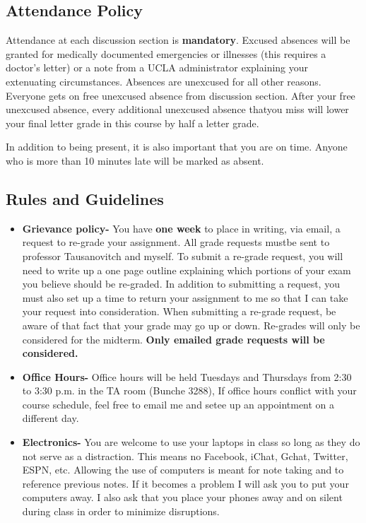 \documentclass[11pt,]{article}
\begin{document}
\subsection{Attendance Policy}\label{attendance-policy}

Attendance at each discussion section is \textbf{mandatory}. Excused
absences will be granted for medically documented emergencies or
illnesses (this requires a doctor's letter) or a note from a UCLA
administrator explaining your extenuating circumstances. Absences are
unexcused for all other reasons. Everyone gets on free unexcused absence
from discussion section. After your free unexcused absence, every
additional unexcused absence thatyou miss will lower your final letter
grade in this course by half a letter grade.

In addition to being present, it is also important that you are on time.
Anyone who is more than 10 minutes late will be marked as absent.

\subsection{Rules and Guidelines}\label{rules-and-guidelines}

\begin{itemize}
\item
  \textbf{Grievance policy-} You have \textbf{one week} to place in
  writing, via email, a request to re-grade your assignment. All grade
  requests mustbe sent to professor Tausanovitch and myself. To submit a
  re-grade request, you will need to write up a one page outline
  explaining which portions of your exam you believe should be
  re-graded. In addition to submitting a request, you must also set up a
  time to return your assignment to me so that I can take your request
  into consideration. When submitting a re-grade request, be aware of
  that fact that your grade may go up or down. Re-grades will only be
  considered for the midterm. \textbf{Only emailed grade requests will
  be considered.}
\item
  \textbf{Office Hours-} Office hours will be held Tuesdays and
  Thursdays from 2:30 to 3:30 p.m. in the TA room (Bunche 3288), If
  office hours conflict with your course schedule, feel free to email me
  and setee up an appointment on a different day.
\item
  \textbf{Electronics-} You are welcome to use your laptops in class so
  long as they do not serve as a distraction. This means no Facebook,
  iChat, Gchat, Twitter, ESPN, etc. Allowing the use of computers is
  meant for note taking and to reference previous notes. If it becomes a
  problem I will ask you to put your computers away. I also ask that you
  place your phones away and on silent during class in order to minimize
  disruptions.
\end{itemize}
\end{document}
